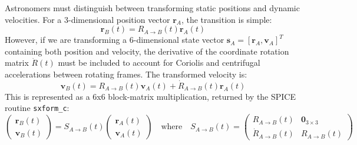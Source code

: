 \documentclass{acta}
\begin{document}
Astronomers must distinguish between transforming static positions and dynamic velocities. For a 3-dimensional position vector $\mathbf{r}_A$, the transition is simple:
\begin{equation}
\mathbf{r}_B(t) = R_{A \to B}(t) \mathbf{r}_A(t)
\end{equation}
However, if we are transforming a 6-dimensional state vector $\mathbf{s}_A = [\mathbf{r}_A, \mathbf{v}_A]^T$ containing both position and velocity, the derivative of the coordinate rotation matrix $\dot{R}(t)$ must be included to account for Coriolis and centrifugal accelerations between rotating frames. The transformed velocity is:
\begin{equation}
\mathbf{v}_B(t) = R_{A \to B}(t) \mathbf{v}_A(t) + \dot{R}_{A \to B}(t) \mathbf{r}_A(t)
\end{equation}
This is represented as a 6x6 block-matrix multiplication, returned by the SPICE routine {\tt sxform\_c}:
\begin{equation}
\begin{pmatrix} \mathbf{r}_B(t) \\ \mathbf{v}_B(t) \end{pmatrix} = S_{A \to B}(t) \begin{pmatrix} \mathbf{r}_A(t) \\ \mathbf{v}_A(t) \end{pmatrix} \quad \text{where} \quad S_{A \to B}(t) = \begin{pmatrix} R_{A \to B}(t) & \mathbf{0}_{3\times 3} \\ \dot{R}_{A \to B}(t) & R_{A \to B}(t) \end{pmatrix}
\end{equation}
\end{document}
